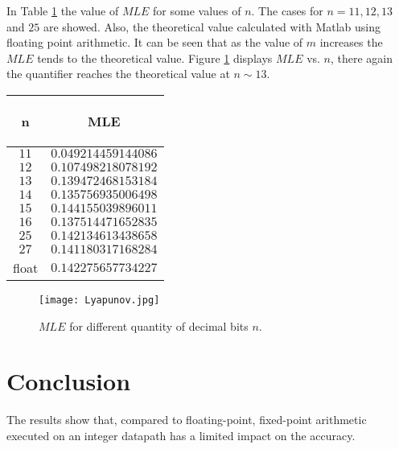 \documentclass[conference]{IEEEtran}
\begin{document}
In Table \ref{MLE} the value of $MLE$ for some values of $n$. The
cases for $n=11, 12, 13$ and $25$ are showed. Also, the
theoretical value calculated with Matlab using floating point
arithmetic. It can be seen that as the value of $m$ increases the
$MLE$ tends to the theoretical value. Figure \ref{MLE} displays
 $MLE$ vs. $n$, there again the quantifier reaches the theoretical value at $n \sim 13$.

\centering

\begin{tabular}{|c|c|}

  \hline\label{MLE}

  n & MLE \\
  \hline
  $11$ & $0.049214459144086$ \\
  $12$ & $0.107498218078192$ \\
  $13$ & $0.139472468153184$ \\
  $14$ & $ 0.135756935006498$ \\
  $15$ & $0.144155039896011$ \\
  $16$ & $0.137514471652835$ \\
  $25$ & $0.142134613438658$ \\
  $27$ & $0.141180317168284$ \\
  float & $0.142275657734227$ \\
   \hline

\end{tabular}

\begin{figure}
    \centering
        \texttt{[image: Lyapunov.jpg]}\\
    \caption{$MLE$ for different quantity of decimal bits $n$.}\label{MLE}

\end{figure}

\section{Conclusion} \label{sec:conclusiones}
The results show that, compared to floating-point, fixed-point
arithmetic executed on an integer datapath has a limited impact on
the accuracy.
%
\end{document}
